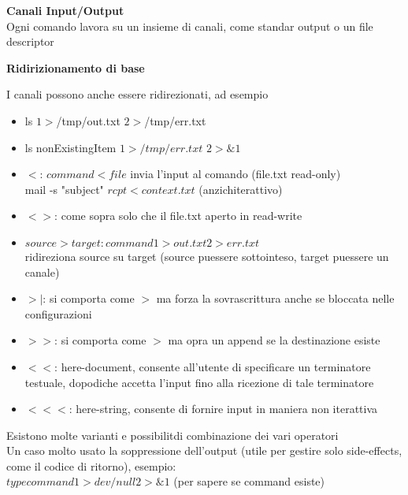 \begin{flushleft}
  \textbf{Canali Input/Output} \\
  Ogni comando lavora su un insieme di canali, come standar output o un file descriptor 
\end{flushleft}
\begin{flushleft}
  \textbf{Ridirizionamento di base}\par 
  I canali possono anche essere ridirezionati, ad esempio
  \begin{itemize}
    \item ls $1>$/tmp/out.txt $2>$/tmp/err.txt
    \item ls nonExistingItem $1>/tmp/err.txt$ $2>\&1$
  \end{itemize}
  \begin{itemize}
    \item $<$: $command<file$ invia l'input al comando (file.txt read-only) \\
          mail -s "subject" $rcpt< context.txt$ (anzich\ace iterattivo)
    \item $<>$: come sopra solo che il file.txt \ace aperto in read-write
    \item $source>target: command 1>out.txt 2>err.txt$ \\
          ridireziona source su target (source pu\aco essere sottointeso, target pu\aco essere un canale)
    \item $>|$: si comporta come $>$ ma forza la sovrascrittura anche se bloccata nelle configurazioni
    \item $>>$: si comporta come $>$ ma opra un append se la destinazione esiste
    \item $<<$: here-document, consente all'utente di specificare  un terminatore testuale, dopodiche 
          accetta l'input fino alla ricezione di tale terminatore
    \item $<<<$: here-string, consente di fornire input in maniera non iterattiva
  \end{itemize}
  Esistono molte varianti e possibilit\aca di combinazione dei vari operatori \\
  Un caso molto usato \ace la soppressione dell'output (utile per gestire solo side-effects, come 
  il codice di ritorno), esempio:\\
  $type command 1>dev/null 2>\&1$ (per sapere se command esiste)
\end{flushleft}
